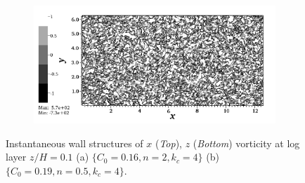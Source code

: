 \begin{figure}
\begin{subfigure}[t]{0.5\textwidth}
                \caption{}
                \label{fig:highdiff}
        \end{subfigure}%
        \centering
        \begin{subfigure}[t]{0.5\textwidth}
                \includegraphics[width=\linewidth]{Fig2/z_vorticity_lowdiff.png}
                \caption{}
                \label{fig:lowdiff}
        \end{subfigure}%
        \caption[Near Wall vorticity structures]{ Instantaneous wall structures of $x$ (\textit{Top}), $z$ (\textit{Bottom}) vorticity  at log layer $z/H = 0.1$ (a) $\lbrace C_0 = 0.16,n = 2, k_c = 4\rbrace$ (b) $\lbrace C_0 = 0.19,n = 0.5, k_c = 4\rbrace $.}\label{fig:vort}
\end{figure}

